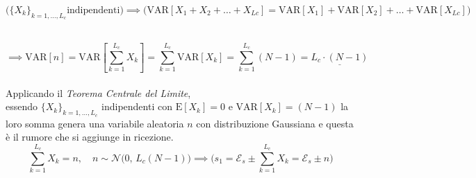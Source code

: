 \documentclass[12pt, a4paper]{article}
\begin{document}
\[
\Bigg( \{X_k\}_{k=1,\dots,L_c}	\text{indipendenti} \Bigg) \implies \Bigg(
\mathrm{VAR}[X_1+X_2+\dots+X_{Lc}] = \mathrm{VAR}[X_1]+\mathrm{VAR}[X_2]+\dots+\mathrm{VAR}[X_{Lc}] \Bigg)
\] \\\vspace{-1.2cm} 

\[
\implies \mathrm{VAR}[n] = \mathrm{VAR}\left[ \sum_{k=1}^{L_c}X_k \right] =
\sum_{k=1}^{L_c}\mathrm{VAR}\left[ X_k \right] = 
\sum_{k=1}^{L_c}\left( N-1 \right) = 
\underline{L_c \cdot (N-1)}
\] \\
Applicando il \textit{Teorema Centrale del Limite},\\
essendo $\{X_k\}_{k=1,\dots,L_c}$
indipendenti con $\mathrm{E}[X_k]=0$ e $\mathrm{VAR}[X_k]=(N-1)$ la loro somma genera una variabile aleatoria $n$ con distribuzione Gaussiana e questa è il rumore che si aggiunge in ricezione.
\[
\sum_{k=1}^{L_c}X_k = n, \quad\boxed{ n\sim\mathcal{N}\Big(0,\, L_c(N-1)\Big) }
\implies \Bigg( s_1 = \mathcal{E}_s \pm \sum_{k=1}^{L_c}X_k = \mathcal{E}_s \pm n \Bigg)
\]
\end{document}
